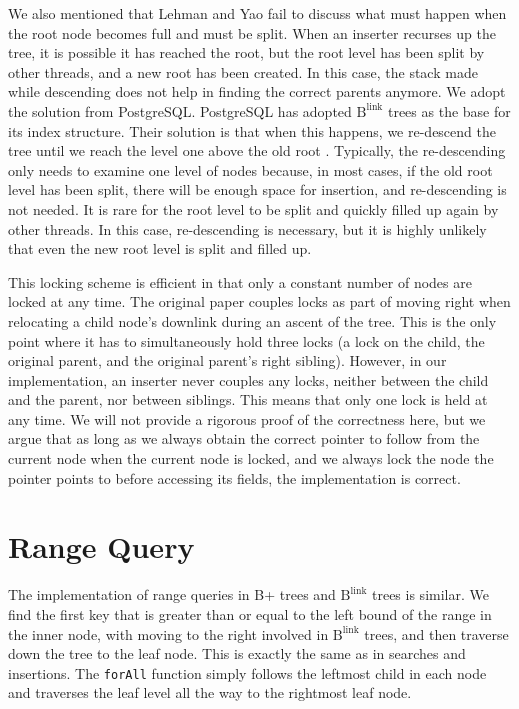 \documentclass[11pt]{report}
\theoremstyle{definition}
\begin{document}
We also mentioned that Lehman and Yao fail to discuss what must happen when the root node becomes full and must be split. When an inserter recurses up the tree, it is possible it has reached the root, but the root level has been split by other threads, and a new root has been created. In this case, the stack made while descending does not help in finding the correct parents anymore. We adopt the solution from PostgreSQL. PostgreSQL has adopted $\text{B}^{\text{link}}$ trees as the base for its index structure. Their solution is that when this happens, we re-descend the tree until we reach the level one above the old root \cite{postgres_readme}. Typically, the re-descending only needs to examine one level of nodes because, in most cases, if the old root level has been split, there will be enough space for insertion, and re-descending is not needed. It is rare for the root level to be split and quickly filled up again by other threads. In this case, re-descending is necessary, but it is highly unlikely that even the new root level is split and filled up.

This locking scheme is efficient in that only a constant number of nodes are locked at any time. The original paper couples locks as part of moving right when relocating a child node's downlink during an ascent of the tree. This is the only point where it has to simultaneously hold three locks (a lock on the child, the original parent, and the original parent's right sibling). However, in our implementation, an inserter never couples any locks, neither between the child and the parent, nor between siblings. This means that only one lock is held at any time. We will not provide a rigorous proof of the correctness here, but we argue that as long as we always obtain the correct pointer to follow from the current node when the current node is locked, and we always lock the node the pointer points to before accessing its fields, the implementation is correct.

\section{Range Query}
\label{sec:range-query}

The implementation of range queries in B+ trees and $\text{B}^{\text{link}}$ trees is similar. We find the first key that is greater than or equal to the left bound of the range in the inner node, with moving to the right involved in $\text{B}^{\text{link}}$ trees, and then traverse down the tree to the leaf node. This is exactly the same as in searches and insertions. The \texttt{forAll} function simply follows the leftmost child in each node and traverses the leaf level all the way to the rightmost leaf node.
\end{document}
